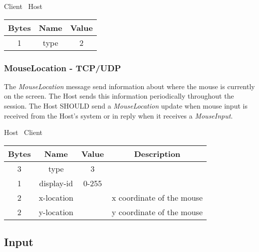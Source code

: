\documentclass{article}
\begin{document}
    \begin{center}
        Client \textrightarrow\ Host\\
        \begin{tabular}{|c|c|c|}
            \hline
            \textbf{Bytes} & \textbf{Name} & \textbf{Value} \\
            \hline
            1              & type          & 2              \\
            \hline
        \end{tabular}
    \end{center}

    \subsubsection{MouseLocation - TCP/UDP}

    The \emph{MouseLocation} message send information about where the mouse is currently on the screen.
    The Host sends this information periodically throughout the session.
    The Host SHOULD send a \emph{MouseLocation} update when mouse input is received from the Host's system or in
    reply when it receives a \emph{MouseInput}.

    \begin{center}
        Host \textrightarrow\ Client\\
        \begin{tabular}{|c|c|c|c|}
            \hline
            \textbf{Bytes} & \textbf{Name} & \textbf{Value} & \textbf{Description}      \\
            \hline
            3              & type          & 3              &                           \\
            \hline
            1              & display-id    & 0-255          &                           \\
            \hline
            2              & x-location    &                & x coordinate of the mouse \\
            \hline
            2              & y-location    &                & y coordinate of the mouse \\
            \hline
        \end{tabular}
    \end{center}

    \subsection{Input}
\end{document}
